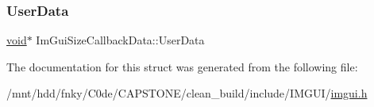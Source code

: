 \subsubsection{\texorpdfstring{User\+Data}{UserData}}
{\footnotesize\ttfamily \hyperlink{imgui__impl__opengl3__loader_8h_ac668e7cffd9e2e9cfee428b9b2f34fa7}{void}$\ast$ Im\+Gui\+Size\+Callback\+Data\+::\+User\+Data}



The documentation for this struct was generated from the following file\+:\begin{DoxyCompactItemize}
\item 
/mnt/hdd/fnky/\+C0de/\+C\+A\+P\+S\+T\+O\+N\+E/clean\+\_\+build/include/\+I\+M\+G\+U\+I/\hyperlink{imgui_8h}{imgui.\+h}\end{DoxyCompactItemize}
